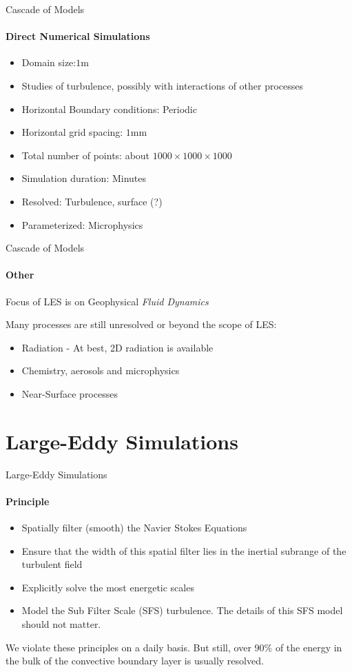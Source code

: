 \begin{frame}{Cascade of Models}
\framesubtitle{Direct Numerical Simulations}
\begin{itemize}
 \item Domain size:$1\mathrm{m}$
 \item Studies of turbulence, possibly with interactions of other processes
 \item Horizontal Boundary conditions: Periodic
 \item Horizontal grid spacing: $1 \mathrm{mm}$
 \item Total number of points: about $1000 \times 1000 \times 1000 $
 \item Simulation duration: Minutes
 \item Resolved: Turbulence, surface (?)
 \item Parameterized: Microphysics
\end{itemize}
 
\end{frame}
\begin{frame}{Cascade of Models}
\framesubtitle{Other}
Focus of LES is on Geophysical \emph{Fluid Dynamics}

Many processes are still unresolved or beyond the scope of LES:
\begin{itemize}
 \item Radiation - At best, 2D radiation is available
 \item Chemistry, aerosols and microphysics
 \item Near-Surface processes
\end{itemize}
\end{frame}

\section{Large-Eddy Simulations}
\begin{frame}[<+->]{Large-Eddy Simulations}
\framesubtitle{Principle}
 \begin{itemize}
  \item Spatially filter (smooth) the Navier Stokes Equations
  \item Ensure that the width of this spatial filter lies in the inertial subrange of the turbulent field
  \item Explicitly solve the most energetic scales
  \item Model the Sub Filter Scale (SFS) turbulence. The details of this SFS model should not matter. 
 \end{itemize}
We violate these principles on a daily basis. But still, over $90\%$ of the energy in the bulk of the convective boundary layer is usually resolved.

\end{frame}

